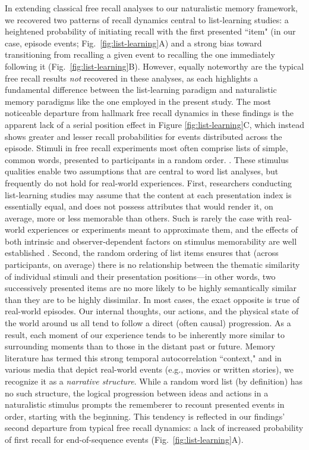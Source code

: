 \documentclass{article}
\begin{document}
In extending classical free recall analyses to our naturalistic memory framework, we recovered two patterns of recall dynamics central to list-learning studies: a heightened probability of initiating recall with the first presented ``item" (in our case, episode events; Fig.~\ref{fig:list-learning}A) and a strong bias toward transitioning from recalling a given event to recalling the one immediately following it (Fig.~\ref{fig:list-learning}B).  However, equally noteworthy are the typical free recall results \textit{not} recovered in these analyses, as each highlights a fundamental difference between the list-learning paradigm and naturalistic memory paradigms like the one employed in the present study.  The most noticeable departure from hallmark free recall dynamics in these findings is the apparent lack of a serial position effect in Figure \ref{fig:list-learning}C, which instead shows greater and lesser recall probabilities for events distributed across the episode.  Stimuli in free recall experiments most often comprise lists of simple, common words, presented to participants in a random order. \citep[In fact, numerous word pools have been developed based on these criteria; e.g.,][]{FrieEtal82}.  These stimulus qualities enable two assumptions that are central to word list analyses, but frequently do not hold for real-world experiences.  First, researchers conducting list-learning studies may assume that the content at each presentation index is essentially equal, and does not possess attributes that would render it, on average, more or less memorable than others.  Such is rarely the case with real-world experiences or experiments meant to approximate them, and the effects of both intrinsic and observer-dependent factors on stimulus memorability are well established \citep[for review see][]{ChunTurk07, ByliEtal15, TyngEtal17}.  Second, the random ordering of list items ensures that (across participants, on average) there is no relationship between the thematic similarity of individual stimuli and their presentation positions---in other words, two successively presented items are no more likely to be highly semantically similar than they are to be highly dissimilar.  In most cases, the exact opposite is true of real-world episodes.  Our internal thoughts, our actions, and the physical state of the world around us all tend to follow a direct (often causal) progression.  As a result, each moment of our experience tends to be inherently more similar to surrounding moments than to those in the distant past or future.  Memory literature has termed this strong temporal autocorrelation ``context," and in various media that depict real-world events (e.g., movies or written stories), we recognize it as a \textit{narrative structure}.  While a random word list (by definition) has no such structure, the logical progression between ideas and actions in a naturalistic stimulus prompts the rememberer to recount presented events in order, starting with the beginning.  This tendency is reflected in our findings' second departure from typical free recall dynamics: a lack of increased probability of first recall for end-of-sequence events (Fig.~\ref{fig:list-learning}A).
\end{document}
